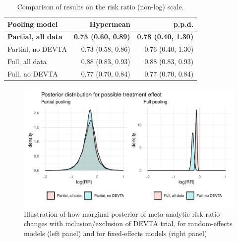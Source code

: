 \documentclass[12pt]{article}
\begin{document}
\begin{table}
\caption{Comparison of results of all four meta-analysis models fitted to our data, on log(RR) scale.}
\label{baggr-models-tab}
\centering
{}
\end{table}

\begin{table}
\caption{Comparison of results on the risk ratio (non-log) scale.}
\label{baggr-tab-exp}
\begin{tabular}[t]{lrr}
\toprule
Pooling model & Hypermean & p.p.d.\\
\midrule
\textbf{Partial, all data} & \textbf{0.75 (0.60, 0.89)} & \textbf{0.78 (0.40, 1.30)}\\
Partial, no DEVTA & 0.73 (0.58, 0.86) & 0.76 (0.40, 1.30)\\
Full, all data & 0.88 (0.83, 0.93) & 0.88 (0.83, 0.93)\\
Full, no DEVTA & 0.77 (0.70, 0.84) & 0.77 (0.70, 0.84)\\
\bottomrule
\end{tabular}
\end{table}

\begin{figure}[h!]
\includegraphics{baggr-density.pdf}
\caption{Illustration of how marginal posterior of meta-analytic risk ratio changes with inclusion/exclusion of DEVTA trial, for random-effects models (left panel) and for fixed-effects models (right panel)}
\label{baggr-density}
\end{figure}
\end{document}
